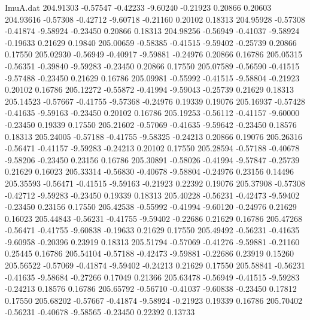 \begin{filecontents}{ImuA.dat}
 204.91303   -0.57547   -0.42233   -9.60240   -0.21923    0.20866    0.20603
 204.93616   -0.57308   -0.42712   -9.60718   -0.21160    0.20102    0.18313
 204.95928   -0.57308   -0.41874   -9.58924   -0.23450    0.20866    0.18313
 204.98256   -0.56949   -0.41037   -9.58924   -0.19633    0.21629    0.19840
 205.00659   -0.58385   -0.41515   -9.59402   -0.25739    0.20866    0.17550
 205.02930   -0.56949   -0.40917   -9.59881   -0.24976    0.20866    0.16786
 205.05315   -0.56351   -0.39840   -9.59283   -0.23450    0.20866    0.17550
 205.07589   -0.56590   -0.41515   -9.57488   -0.23450    0.21629    0.16786
 205.09981   -0.55992   -0.41515   -9.58804   -0.21923    0.20102    0.16786
 205.12272   -0.55872   -0.41994   -9.59043   -0.25739    0.21629    0.18313
 205.14523   -0.57667   -0.41755   -9.57368   -0.24976    0.19339    0.19076
 205.16937   -0.57428   -0.41635   -9.59163   -0.23450    0.20102    0.16786
 205.19253   -0.56112   -0.41157   -9.60000   -0.23450    0.19339    0.17550
 205.21602   -0.57069   -0.41635   -9.59642   -0.23450    0.18576    0.18313
 205.24005   -0.57188   -0.41755   -9.58325   -0.24213    0.20866    0.19076
 205.26316   -0.56471   -0.41157   -9.59283   -0.24213    0.20102    0.17550
 205.28594   -0.57188   -0.40678   -9.58206   -0.23450    0.23156    0.16786
 205.30891   -0.58026   -0.41994   -9.57847   -0.25739    0.21629    0.16023
 205.33314   -0.56830   -0.40678   -9.58804   -0.24976    0.23156    0.14496
 205.35593   -0.56471   -0.41515   -9.59163   -0.21923    0.22392    0.19076
 205.37908   -0.57308   -0.42712   -9.59283   -0.23450    0.19339    0.18313
 205.40228   -0.56231   -0.42473   -9.59402   -0.23450    0.23156    0.17550
 205.42538   -0.55992   -0.41994   -9.60120   -0.24976    0.21629    0.16023
 205.44843   -0.56231   -0.41755   -9.59402   -0.22686    0.21629    0.16786
 205.47268   -0.56471   -0.41755   -9.60838   -0.19633    0.21629    0.17550
 205.49492   -0.56231   -0.41635   -9.60958   -0.20396    0.23919    0.18313
 205.51794   -0.57069   -0.41276   -9.59881   -0.21160    0.25445    0.16786
 205.54104   -0.57188   -0.42473   -9.59881   -0.22686    0.23919    0.15260
 205.56522   -0.57069   -0.41874   -9.59402   -0.24213    0.21629    0.17550
 205.58841   -0.56231   -0.41635   -9.58684   -0.27266    0.17049    0.21366
 205.63478   -0.56949   -0.41515   -9.59283   -0.24213    0.18576    0.16786
 205.65792   -0.56710   -0.41037   -9.60838   -0.23450    0.17812    0.17550
 205.68202   -0.57667   -0.41874   -9.58924   -0.21923    0.19339    0.16786
 205.70402   -0.56231   -0.40678   -9.58565   -0.23450    0.22392    0.13733

\end{filecontents}
